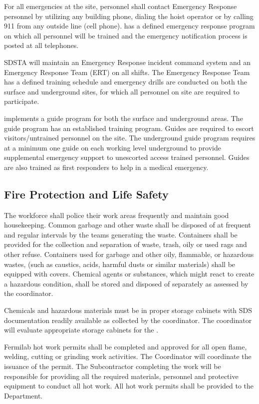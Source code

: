 For all emergencies at the  site, personnel shall contact
Emergency Response personnel by utilizing any building phone, dialing
the hoist operator or by calling 911 from any outside line (cell
phone).   has a defined emergency response program on which all
personnel will be trained and the emergency notification process is
posted at all telephones.

SDSTA will maintain an Emergency Response incident command system
and an Emergency Response Team (ERT) on all shifts. The Emergency
Response Team has a defined training schedule and emergency drills are
conducted on both the surface and underground sites, for which all
personnel on site are required to participate.

 implements a guide program for both the surface and underground
areas. The guide program has an established training program. Guides
are required to escort visitors/untrained personnel on the 
site. The underground guide program requires at a minimum one guide on
each working level underground to provide supplemental emergency
support to unescorted access trained personnel. Guides are also
trained as first responders to help in a medical emergency.

\subsection{Fire Protection and Life Safety}

The workforce shall police their work areas frequently and maintain
good housekeeping. Common garbage and other waste shall be disposed of
at frequent and regular intervals by the teams generating the
waste. Containers shall be provided for the collection and separation
of waste, trash, oily or used rags and other refuse.  Containers used
for garbage and other oily, flammable, or hazardous wastes, (such as
caustics, acids, harmful dusts or similar materials) shall be equipped
with covers.  Chemical agents or substances, which might react to
create a hazardous condition, shall be stored and disposed of
separately as assessed by the  
coordinator.

Chemicals and hazardous materials must be in proper storage cabinets
with SDS documentation readily available as collected by the
  coordinator. The
  coordinator will evaluate
appropriate storage cabinets for the .

Fermilab hot work permits shall be completed and approved for all open
flame, welding, cutting or grinding work activities.  The 
 Coordinator will coordinate the issuance of the permit.
The Subcontractor completing the work will be responsible for
providing all the required materials, personnel and protective
equipment to conduct all hot work. All hot work permits shall be
provided to the   Department.

